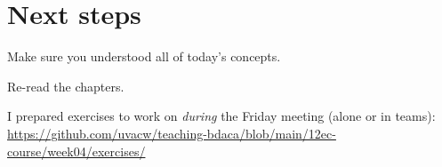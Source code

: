 
\section{Next steps}

\begin{frame}[standout]
Make sure you understood all of today's concepts.

Re-read the chapters.

I prepared exercises to work on \emph{during} the Friday meeting (alone or in teams):
\large{\url{https://github.com/uvacw/teaching-bdaca/blob/main/12ec-course/week04/exercises/}}
\end{frame}





\begin{frame}
	\printbibliography
\end{frame}




